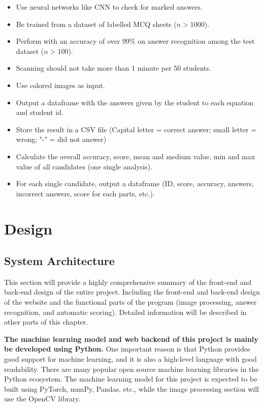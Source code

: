 \documentclass[twocolumn]{article}
\begin{document}
\begin{itemize}
    \begin{itemize}
        \item Use neural networks like CNN to check for marked answers.
        \item Be trained from a dataset of labelled MCQ sheets ($n > 1000$).
        \item Perform with an accuracy of over 99\% on answer recognition among the test dataset ($n > 100$).
        \item Scanning should not take more than 1 minute per 50 students.
        \item Use colored images as input.
        \item Output a dataframe with the answers given by the student to each equation and student id.
        \item Store the result in a CSV file (Capital letter = correct answer; small letter = wrong; "-" = did not answer)
        \item Calculate the overall accuracy, score, mean and medium value, min and max value of all candidates (one single analysis).
        \item For each single candidate, output a dataframe (ID, score, accuracy, answers, incorrect answers, score for each parts, etc.).
    \end{itemize}
\end{itemize}

\section{Design}
    \subsection{System Architecture}
    This section will provide a highly comprehensive summary of the front-end and back-end design of the entire project. Including the front-end and back-end design of the website and the functional parts of the program (image processing, answer recognition, and automatic scoring). Detailed information will be described in other parts of this chapter.


    \textbf{The machine learning model and web backend of this project is mainly be developed using Python.} One important reason is that Python provides good support for machine learning, and it is also a high-level language with good readability. There are many popular open source machine learning libraries in the Python ecosystem. The machine learning model for this project is expected to be built using PyTorch\cite{torch}, numPy\cite{numpy}, Pandas\cite{pandas}, etc., while the image processing section will use the OpenCV library.
\end{document}

